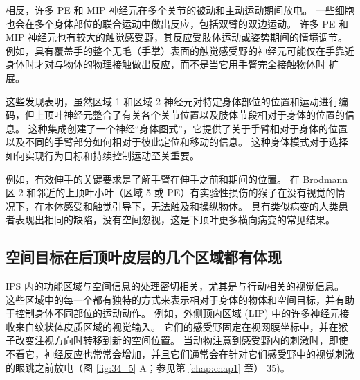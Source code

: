 相反，许多 PE 和 MIP 神经元在多个关节的被动和主动运动期间放电。 一些细胞也会在多个身体部位的联合运动中做出反应，包括双臂的双边运动。 许多 PE 和 MIP 神经元也有较大的触觉感受野，其反应受肢体运动或姿势期间的情境调节。 例如，具有覆盖手的整个无毛（手掌）表面的触觉感受野的神经元可能仅在手靠近身体时才对与物体的物理接触做出反应，而不是当它用手臂完全接触物体时 扩展。

这些发现表明，虽然区域 1 和区域 2 神经元对特定身体部位的位置和运动进行编码，但上顶叶神经元整合了有关各个关节位置以及肢体节段相对于身体的位置的信息。 这种集成创建了一个神经“身体图式”，它提供了关于手臂相对于身体的位置以及不同的手臂部分如何相对于彼此定位和移动的信息。 这种身体模式对于选择如何实现行为目标和持续控制运动至关重要。

例如，有效伸手的关键要求是了解手臂在伸手之前和期间的位置。 在 Brodmann 区 2 和邻近的上顶叶小叶（区域 5 或 PE）有实验性损伤的猴子在没有视觉的情况下，在本体感受和触觉引导下，无法触及和操纵物体。 具有类似病变的人类患者表现出相同的缺陷，没有空间忽视，这是下顶叶更多横向病变的常见结果。


\subsection{空间目标在后顶叶皮层的几个区域都有体现}
IPS 内的功能区域与空间信息的处理密切相关，尤其是与行动相关的视觉信息。 这些区域中的每一个都有独特的方式来表示相对于身体的物体和空间目标，并有助于控制身体不同部位的运动动作。 例如，外侧顶内区域 (LIP) 中的许多神经元接收来自纹状体皮质区域的视觉输入。 它们的感受野固定在视网膜坐标中，并在猴子改变注视方向时转移到新的空间位置。 
当动物注意到感受野内的刺激时，即使不看它，神经反应也常常会增加，并且它们通常会在针对它们感受野中的视觉刺激的眼跳之前放电（图 \ref{fig:34_5} A；参见第 \ref{chap:chap1} 章） 35)。

